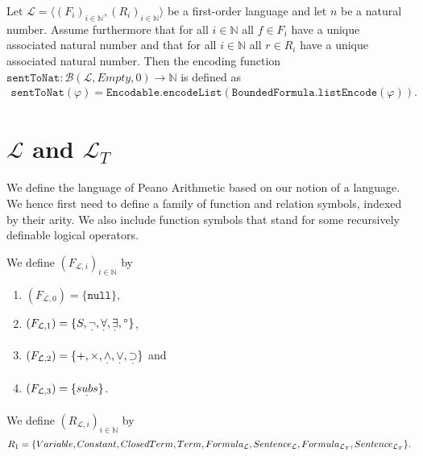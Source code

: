 \begin{definition}\label{def:S-To-N}
  \leanok
    Let $\mathcal{L} = \langle (F_i)_{i \in \mathbb{N}}, (R_i)_{i \in \mathbb{N}} \rangle$ be a first-order language and let $n$ be a natural number. Assume furthermore that for all $i \in \mathbb{N}$ all $f \in F_i$ have a unique associated natural number and that for all $i \in \mathbb{N}$ all $r \in R_i$ have a unique associated natural number. Then the encoding function $\texttt{sentToNat} : \mathcal{B}(\mathcal{L},Empty,0) \to \mathbb{N}$ is defined as 
    \begin{align*}
        \texttt{sentToNat}(\varphi) = \texttt{Encodable.encodeList}(\texttt{BoundedFormula.listEncode}(\varphi)).
    \end{align*}
\end{definition}

\section{$\mathcal{L}$ and $\mathcal{L}_T$}\label{subsec:lpa-lt}
We define the language of Peano Arithmetic based on our notion of a language. We hence first need to define a family of function and relation symbols, indexed by their arity. We also include function symbols that stand for some recursively definable logical operators.

\begin{definition}\label{def:L-Func}
  \leanok
  We define $(F_{\mathcal{L},i})_{i \in \mathbb{N}}$ by
  \begin{enumerate}
  \item $(F_{\mathcal{L},0}) = \{\texttt{null}\}$,
  \item $(F_{\mathcal{L},1}) = \{S, \underset{^{\boldsymbol{\cdot}}}{\neg} , \underset{^{\boldsymbol{\cdot}}}{\forall}, \underset{^{\boldsymbol{\cdot}}}{\exists}, {^\circ}\}$,
  \item $(F_{\mathcal{L},2}) = \{+,\times, \underset{^{\boldsymbol{\cdot}}}{\wedge}, \underset{^{\boldsymbol{\cdot}}}{\vee}, \underset{^{\boldsymbol{\cdot}}}{\supset}\}$ and
  \item $(F_{\mathcal{L},3}) = \{\underset{^{\boldsymbol{\cdot}}}{subs}\}$.
  \end{enumerate}
\end{definition}

\begin{definition}\label{def:L-Rel}
  \leanok
  We define $(R_{\mathcal{L},i})_{i \in \mathbb{N}}$ by \[R_1 = \{Variable, Constant, ClosedTerm, Term, Formula_{\mathcal{L}}, Sentence_{\mathcal{L}}, \\ Formula_{\mathcal{L}_T}, Sentence_{\mathcal{L}_T}\}.\]
\end{definition}

